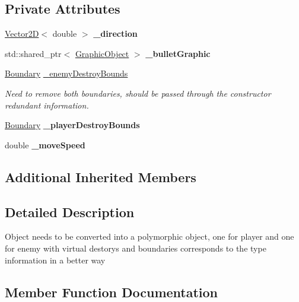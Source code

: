 \subsection*{Private Attributes}
\begin{DoxyCompactItemize}
\item 
\mbox{\label{class_projectile_a09ce3faf8a832bd07390d93cb97a4fcb}} 
\hyperlink{class_vector2_d}{Vector2D}$<$ double $>$ {\bfseries \+\_\+direction}
\item 
\mbox{\label{class_projectile_a67ee06b3b2dcf15482c9866920a8e825}} 
std\+::shared\+\_\+ptr$<$ \hyperlink{class_graphic_object}{Graphic\+Object} $>$ {\bfseries \+\_\+bullet\+Graphic}
\item 
\mbox{\label{class_projectile_a9ec636b54686a4889b433566763b6646}} 
\hyperlink{class_boundary}{Boundary} \hyperlink{class_projectile_a9ec636b54686a4889b433566763b6646}{\+\_\+enemy\+Destroy\+Bounds}
\begin{DoxyCompactList}\small\item\em Need to remove both boundaries, should be passed through the constructor redundant information. \end{DoxyCompactList}\item 
\mbox{\label{class_projectile_a29ce4100add75a6e82860c28343a34cf}} 
\hyperlink{class_boundary}{Boundary} {\bfseries \+\_\+player\+Destroy\+Bounds}
\item 
\mbox{\label{class_projectile_a24c0fc8a55acd5fd13c4165404bb7817}} 
double {\bfseries \+\_\+move\+Speed}
\end{DoxyCompactItemize}
\subsection*{Additional Inherited Members}


\subsection{Detailed Description}
Object needs to be converted into a polymorphic object, one for player and one for enemy with virtual destorys and boundaries corresponds to the type information in a better way 

\subsection{Member Function Documentation}
\mbox{\label{class_projectile_ac128cf116d9fd114bce2a49af797da1f}} 

